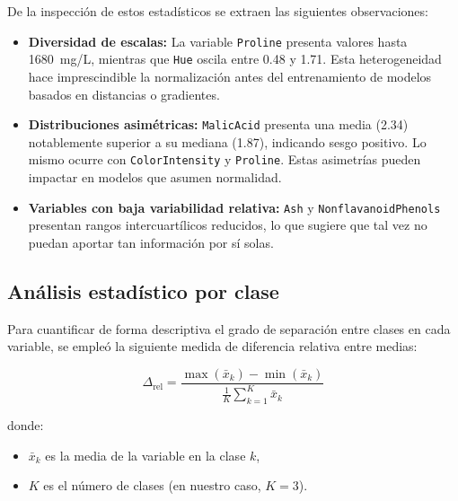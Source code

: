 De la inspecci\'on de estos estad\'isticos se extraen las siguientes observaciones:

\begin{itemize}
    \item \textbf{Diversidad de escalas:} La variable \texttt{Proline} presenta
    valores hasta 1680~mg/L, mientras que \texttt{Hue} oscila entre 0.48 y 1.71.
    Esta heterogeneidad hace imprescindible la normalizaci\'on antes del entrenamiento
    de modelos basados en distancias o gradientes.

    \item \textbf{Distribuciones asim\'etricas:} \texttt{MalicAcid} presenta una
    media (2.34) notablemente superior a su mediana (1.87), indicando sesgo positivo.
    Lo mismo ocurre con \texttt{ColorIntensity} y \texttt{Proline}. Estas asimetr\'ias
    pueden impactar en modelos que asumen normalidad.

    \item \textbf{Variables con baja variabilidad relativa:} \texttt{Ash} y
    \texttt{NonflavanoidPhenols} presentan rangos intercuart\'ilicos reducidos, lo
    que sugiere que tal vez no puedan aportar tan información por sí solas.
\end{itemize}

\subsection{An\'alisis estadístico por clase}


Para cuantificar de forma descriptiva el grado de separación entre clases en cada variable,
se empleó la siguiente medida de diferencia relativa entre medias:

\[
\Delta_{\text{rel}} = 
\frac{\max(\bar{x}_k) - \min(\bar{x}_k)}
{\displaystyle \frac{1}{K} \sum_{k=1}^{K} \bar{x}_k}
\]

donde:

\begin{itemize}
    \item $\bar{x}_k$ es la media de la variable en la clase $k$,
    \item $K$ es el número de clases (en nuestro caso, $K = 3$).
\end{itemize}

